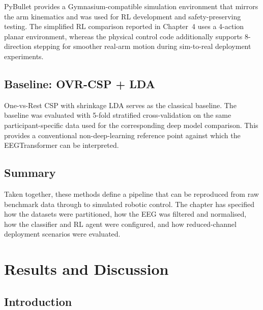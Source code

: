 \documentclass[12pt, a4paper]{article}
\begin{document}
PyBullet provides a Gymnasium-compatible simulation environment that mirrors the arm kinematics and was used for RL development and safety-preserving testing. The simplified RL comparison reported in Chapter~4 uses a 4-action planar environment, whereas the physical control code additionally supports 8-direction stepping for smoother real-arm motion during sim-to-real deployment experiments.

\subsection{Baseline: OVR-CSP + LDA}

One-vs-Rest CSP with shrinkage LDA serves as the classical baseline. The baseline was evaluated with 5-fold stratified cross-validation on the same participant-specific data used for the corresponding deep model comparison. This provides a conventional non-deep-learning reference point against which the EEGTransformer can be interpreted.

\subsection{Summary}

Taken together, these methods define a pipeline that can be reproduced from raw benchmark data through to simulated robotic control. The chapter has specified how the datasets were partitioned, how the EEG was filtered and normalised, how the classifier and RL agent were configured, and how reduced-channel deployment scenarios were evaluated.

\section{Results and Discussion}

\subsection{Introduction}
\end{document}
